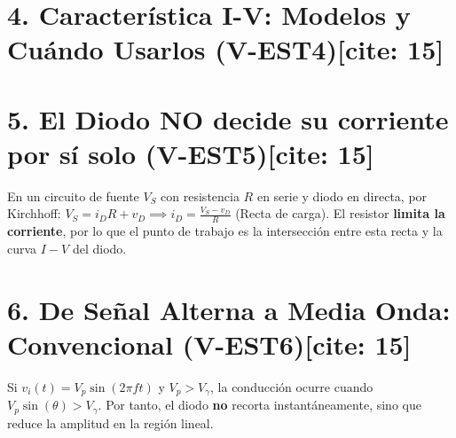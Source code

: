 \documentclass[10pt, a4paper]{article}
\begin{document}
\section*{4. Característica I-V: Modelos y Cuándo Usarlos (V-EST4)[cite: 15]}
\begin{center}
\end{center}

\section*{5. El Diodo NO decide su corriente por sí solo (V-EST5)[cite: 15]}
En un circuito de fuente $V_S$ con resistencia $R$ en serie y diodo en directa, por Kirchhoff: $V_S = i_D R + v_D \implies i_D = \frac{V_S - v_D}{R}$ (Recta de carga). El resistor \textbf{limita la corriente}, por lo que el punto de trabajo es la intersección entre esta recta y la curva $I-V$ del diodo.

\section*{6. De Señal Alterna a Media Onda: Convencional (V-EST6)[cite: 15]}
Si $v_i(t) = V_p \sin(2\pi f t)$ y $V_p > V_\gamma$, la conducción ocurre cuando $V_p \sin(\theta) > V_\gamma$. Por tanto, el diodo \textbf{no} recorta instantáneamente, sino que reduce la amplitud en la región lineal.
\end{document}
